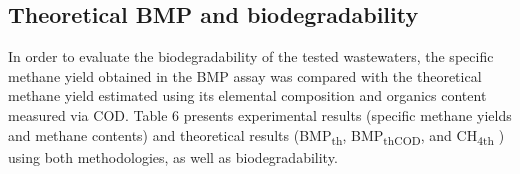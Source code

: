 \subsection{Theoretical BMP and biodegradability}
In order to evaluate the biodegradability of the tested wastewaters, the specific methane yield obtained in the BMP assay was compared with the theoretical methane yield estimated using its elemental composition and organics content measured via COD. Table 6 presents experimental results (specific methane yields and methane contents) and theoretical results (BMP\textsubscript{th}, BMP\textsubscript{thCOD}, and CH\textsubscript{4th} ) using both methodologies, as well as biodegradability.
